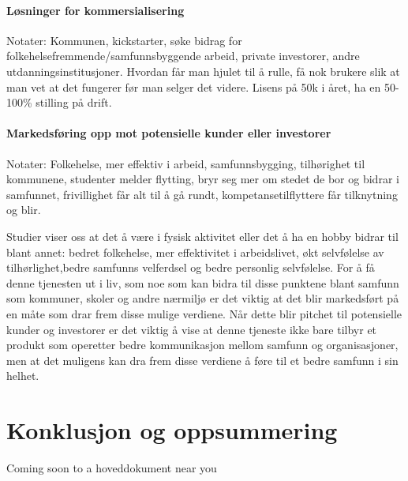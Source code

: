 \paragraph{Løsninger for kommersialisering}
Notater:
Kommunen, kickstarter, søke bidrag for folkehelsefremmende/samfunnsbyggende arbeid, private investorer, andre utdanningsinstitusjoner. Hvordan får man hjulet til å rulle, få nok brukere slik at man vet at det fungerer før man selger det videre. Lisens på 50k i året, ha en 50-100\% stilling på drift.

\paragraph{Markedsføring opp mot potensielle kunder eller investorer}
Notater:
Folkehelse, mer effektiv i arbeid, samfunnsbygging, tilhørighet til kommunene, studenter melder flytting, bryr seg mer om stedet de bor og bidrar i samfunnet, frivillighet får alt til å gå rundt, kompetansetilflyttere får tilknytning og blir.

Studier viser oss at det å være i fysisk aktivitet eller det å ha en hobby bidrar til blant annet: bedret folkehelse, mer effektivitet i arbeidslivet, økt selvfølelse av tilhørlighet,bedre samfunns velferdsel og bedre personlig selvfølelse. For å få denne tjenesten ut i liv, som noe som kan bidra til disse punktene blant samfunn som kommuner, skoler og andre nærmiljø er det viktig at det blir markedsført på en måte som drar frem disse mulige verdiene. Når dette blir pitchet til potensielle kunder og investorer er det viktig å vise at denne tjeneste ikke bare tilbyr et produkt som operetter bedre kommunikasjon mellom samfunn og organisasjoner, men at det muligens kan dra frem disse verdiene å føre til et bedre samfunn i sin helhet.


\section{Konklusjon og oppsummering}
Coming soon to a hoveddokument near you






